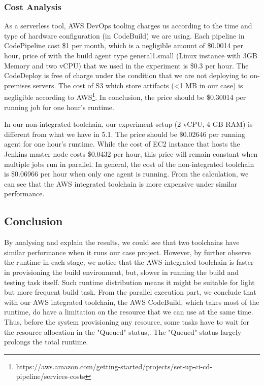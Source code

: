  \subsubsection{Cost Analysis}
 As a serverless tool, AWS DevOps tooling charges us according to the time and type of hardware configuration (in CodeBuild) we are using.
  Each pipeline in CodePipeline cost \$1 per month, which is a negligible amount of \$0.0014 per hour, price of with the build agent type general1.small (Linux instance with 3GB Memory and two vCPU) that we used in the experiment is \$0.3 per hour. The CodeDeploy is free of charge under the condition that we are not deploying to on-premises servers. The cost of S3 which store artifacts (<1 MB in our case) is negligible according to AWS\footnote{https://aws.amazon.com/getting-started/projects/set-up-ci-cd-pipeline/services-costs}. In conclusion, the price should be \$0.30014 per running job for one hour's runtime.
  \par
  In our non-integrated toolchain, our experiment setup (2 vCPU, 4 GB RAM) is different from what we have in 5.1. The price should be \$0.02646 per running agent for one hour's runtime. While the cost of EC2 instance that hosts the Jenkins master node costs \$0.0432 per hour, this price will remain constant when multiple jobs run in parallel. In general, the cost of the non-integrated toolchain is \$0.06966 per hour when only one agent is running.
From the calculation, we can see that the AWS integrated toolchain is more expensive under similar performance.
\subsection{Conclusion}
By analysing and explain the results, we could see that two toolchains have similar performance when it runs our case project. However, by further observe the runtime in each stage, we notice that the AWS integrated toolchain is faster in provisioning the build environment, but, slower in running the build and testing task itself. Such runtime distribution means it might be suitable for light but more frequent build task. From the parallel execution part, we conclude that with our AWS integrated toolchain, the AWS CodeBuild, which takes most of the runtime, do have a limitation on the resource that we can use at the same time. Thus, before the system provisioning any resource, some tasks have to wait for the resource allocation in the "Queued" status,. The "Queued" status largely prolongs the total runtime. 